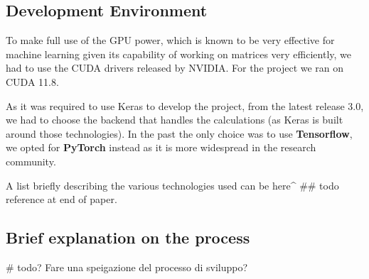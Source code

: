 \subsection{Development Environment}
To make full use of the GPU power, which is known to be very effective for machine learning given its
capability of working on matrices very efficiently, we had to use the CUDA drivers released by NVIDIA.
For the project we ran on CUDA 11.8.

As it was required to use Keras to develop the project, from the latest release 3.0, we had to choose
the backend that handles the calculations (as Keras is built around those technologies).
In the past the only choice was to use \textbf{Tensorflow}, we opted for \textbf{PyTorch} instead as it
is more widespread in the research community.

A list briefly describing the various technologies used can be here^ ## todo reference at end of paper.


\subsection{Brief explanation on the process}
# todo? Fare una speigazione del processo di sviluppo?